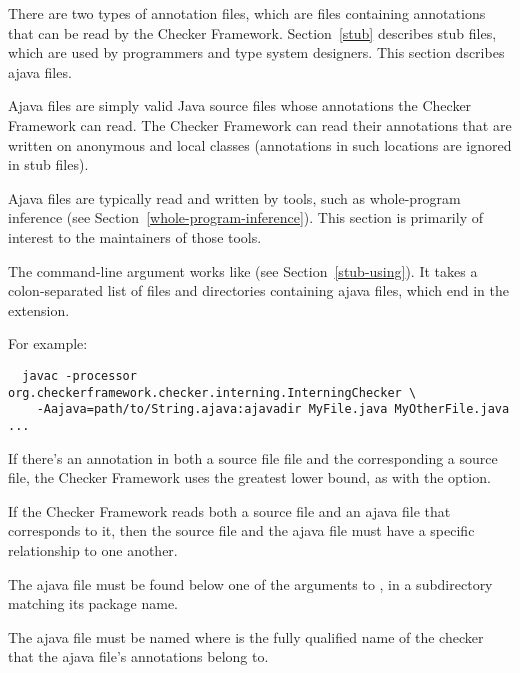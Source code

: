 
There are two types of annotation files, which are files containing annotations that
can be read by the Checker Framework.
Section~\ref{stub} describes stub files, which are used by programmers and
type system designers.
This section dscribes ajava files.

Ajava files are simply valid Java
source files whose annotations the Checker Framework can read.
The Checker Framework can read their annotations that are written
on anonymous and local classes (annotations in such locations are ignored
in stub files).

Ajava files are typically read and written by tools, such as whole-program
inference (see Section~\ref{whole-program-inference}).  This section is
primarily of interest to the maintainers of those tools.



The  command-line argument works like  (see
Section~\ref{stub-using}). It takes a colon-separated list of
files and directories containing ajava files, which end in the 
extension.

For example:

\begin{myxsmall}
\begin{Verbatim}
  javac -processor org.checkerframework.checker.interning.InterningChecker \
    -Aajava=path/to/String.ajava:ajavadir MyFile.java MyOtherFile.java ...
\end{Verbatim}
\end{myxsmall}

If there's an annotation in both a source file file and the corresponding a
source file, the Checker Framework uses the greatest lower bound, as with
the \code{-AmergeStubsWithSource} option.




If the Checker Framework reads both a source file and an ajava file that
corresponds to it, then the source file and the ajava file must have a
specific relationship to one another.



The ajava file must be found below one of the arguments to
, in a subdirectory matching its package name.

The ajava file must be named
 where
 is the fully qualified name of the checker that
the ajava file's annotations belong to.

